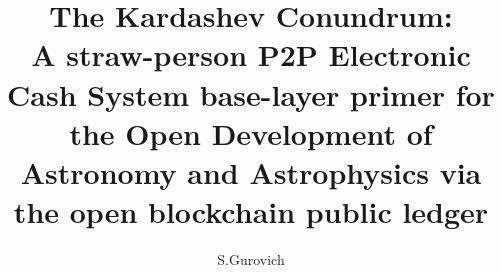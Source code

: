 \documentclass[final,5p,times,twocolumn,authoryear]{elsarticle}
\begin{document}
\begin{frontmatter}

\title{The Kardashev Conundrum:\\ A straw-person P2P Electronic Cash System base-layer primer for the Open Development of Astronomy and Astrophysics via the open blockchain public ledger}
 
    \author[iate,wsu]{S.Gurovich}
  
\address[iate]{
   Instituto De Astronom\'ia Te\'orica y Experimental -
   Observatorio Astron\'omico C\'ordoba (IATE--OAC--UNC--CONICET),
   Laprida 854, X5000BGR, C\'ordoba, Argentina}
\address[wsu]{
   Western Sydney University, Kingswood campus, NSW, Australia (visiting fellow 2019-2020)
}


\end{frontmatter}
\end{document}
